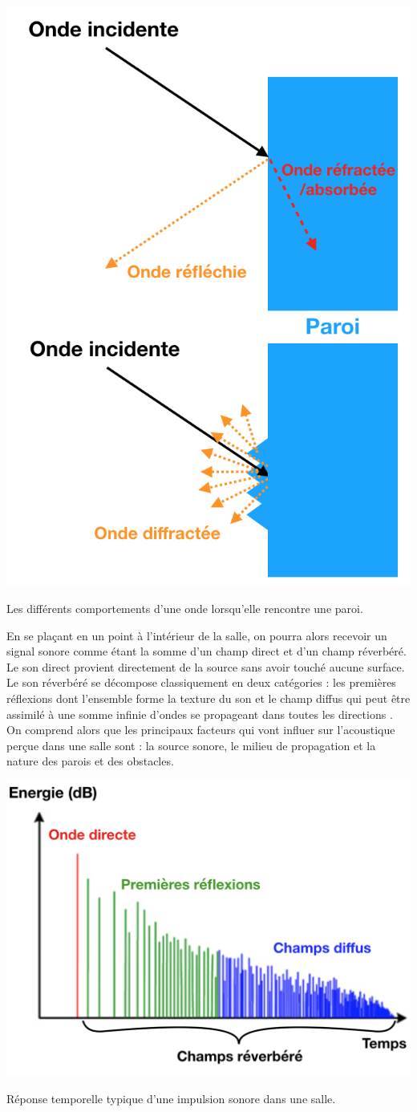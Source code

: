 \begin{figureth}
	\includegraphics[width=0.5\linewidth]{images/schema_absorption}
	\caption[Les différents comportements d'une onde lorsqu'elle rencontre une paroi]{Les différents comportements d'une onde lorsqu'elle rencontre une paroi.} %
	\label{schema_absorption}
\end{figureth}

En se plaçant en un point à l'intérieur de la salle, on pourra alors recevoir un signal sonore comme étant la somme d'un champ direct et d’un champ réverbéré. Le son direct provient directement de la source sans avoir touché aucune surface. Le son réverbéré se décompose classiquement en deux catégories : les premières réflexions dont l'ensemble forme la texture du son et le champ diffus qui peut être assimilé à une somme infinie d'ondes se propageant dans toutes les directions \cite[p. 9]{jouhaneau}.
On comprend alors que les principaux facteurs qui vont influer sur l'acoustique perçue dans une salle sont : la source sonore, le milieu de propagation et la nature des parois et des obstacles.

\begin{figureth}
	\includegraphics[width=0.7\linewidth]{images/RIR_schematique}
	\caption{Réponse temporelle typique d'une impulsion sonore dans une salle.}
	\label{RIR_schematique}
\end{figureth}

